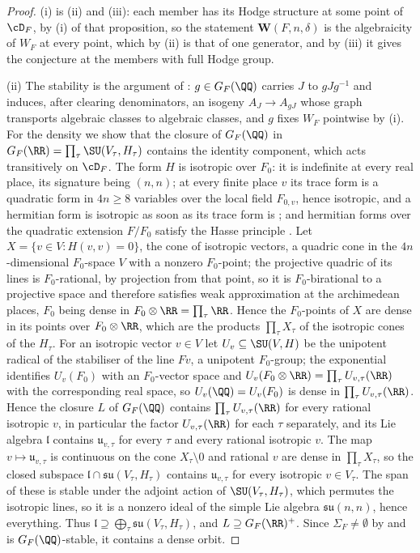 \begin{proof}
(i) is (ii) and (iii): each member has its Hodge structure
at some point of $\cD_{F}$, by (i) of that proposition, so the statement
$\mathbf{W}(F,n,\delta)$ is the algebraicity of $W_{F}$ at every point, which
by (ii) is that of one generator, and by (iii) it gives the conjecture at the
members with full Hodge group.

(ii) The stability is the argument of : $g\in G_{F}(\QQ)$
carries $J$ to $gJg^{-1}$ and induces, after clearing denominators, an isogeny
$A_{J}\to A_{gJ}$ whose graph transports algebraic classes to algebraic
classes, and $g$ fixes $W_{F}$ pointwise by (i). For the
density we show that the closure of $G_{F}(\QQ)$ in $G_{F}(\RR)
=\prod_{\tau}\SU(V_{\tau},H_{\tau})$ contains the identity component, which
acts transitively on $\cD_{F}$. The form $H$ is isotropic over $F_{0}$: it is
indefinite at every real place, its signature being $(n,n)$; at every finite
place $v$ its trace form is a quadratic form in $4n\ge8$ variables over the
local field $F_{0,v}$, hence isotropic, and a hermitian form is isotropic as
soon as its trace form is \cite[Ch.~10, \S1]{Sch85}; and hermitian forms over
the quadratic extension $F/F_{0}$ satisfy the Hasse principle
\cite[Ch.~10, \S6]{Sch85}. Let
$X=\{v\in V:H(v,v)=0\}$, the cone of isotropic vectors, a quadric cone in
the $4n$-dimensional $F_{0}$-space $V$ with a nonzero $F_{0}$-point; the
projective quadric of its lines is $F_{0}$-rational, by projection from that
point, so it is $F_{0}$-birational to a projective space and therefore
satisfies weak approximation at the archimedean places, $F_{0}$ being dense
in $F_{0}\otimes\RR=\prod_{\tau}\RR$. Hence the $F_{0}$-points of $X$ are
dense in its points over $F_{0}\otimes\RR$, which are the products
$\prod_{\tau}X_{\tau}$ of the isotropic cones of the $H_{\tau}$. For an isotropic vector $v\in V$ let $U_{v}\subseteq\SU(V,H)$ be
the unipotent radical of the stabiliser of the line $Fv$, a unipotent
$F_{0}$-group; the exponential identifies $U_{v}(F_{0})$ with an
$F_{0}$-vector space and $U_{v}(F_{0}\otimes\RR)=\prod_{\tau}U_{v,\tau}(\RR)$
with the corresponding real space, so $U_{v}(\QQ)=U_{v}(F_{0})$ is dense in
$\prod_{\tau}U_{v,\tau}(\RR)$. Hence the closure $L$ of $G_{F}(\QQ)$ contains
$\prod_{\tau}U_{v,\tau}(\RR)$ for every rational isotropic $v$, in particular
the factor $U_{v,\tau}(\RR)$ for each $\tau$ separately, and its Lie algebra
$\mathfrak{l}$ contains $\mathfrak{u}_{v,\tau}$ for every $\tau$ and every
rational isotropic $v$. The map $v\mapsto\mathfrak{u}_{v,\tau}$ is continuous
on the cone $X_{\tau}\setminus0$ and rational $v$ are dense in
$\prod_{\tau}X_{\tau}$, so the closed subspace
$\mathfrak{l}\cap\mathfrak{su}(V_{\tau},H_{\tau})$ contains
$\mathfrak{u}_{v,\tau}$ for every isotropic $v\in V_{\tau}$. The span of these
is stable under the adjoint action of $\SU(V_{\tau},H_{\tau})$, which permutes
the isotropic lines, so it is a nonzero ideal of the simple Lie algebra
$\mathfrak{su}(n,n)$, hence everything. Thus
$\mathfrak{l}\supseteq\bigoplus_{\tau}\mathfrak{su}(V_{\tau},H_{\tau})$, and
$L\supseteq G_{F}(\RR)^{+}$. Since $\Sigma_{F}\ne\emptyset$ by
 and is $G_{F}(\QQ)$-stable, it contains a dense orbit.


\end{proof}
